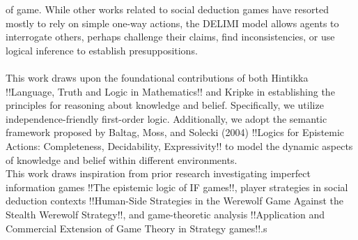 of game. While other works related to social deduction games have resorted
mostly to rely on simple one-way actions, the DELIMI model allows agents to
interrogate others, perhaps challenge their claims, find inconsistencies, or
use logical inference to establish presuppositions.
 \\ \\ This work draws upon the foundational contributions of both Hintikka
!!Language, Truth and Logic in Mathematics!! and Kripke in establishing the
principles for reasoning about knowledge and belief. Specifically, we utilize
independence-friendly first-order logic. Additionally, we adopt the semantic
framework proposed by Baltag, Moss, and Solecki (2004) !!Logics for Epistemic
Actions: Completeness, Decidability, Expressivity!! to model the dynamic
aspects of knowledge and belief within different environments.
\\ This work draws inspiration from prior research investigating imperfect
information games !!The epistemic logic of IF games!!, player strategies in
social deduction contexts !!Human-Side Strategies in the Werewolf Game Against
the Stealth Werewolf Strategy!!, and game-theoretic analysis !!Application and
Commercial Extension of Game Theory in Strategy games!!.s